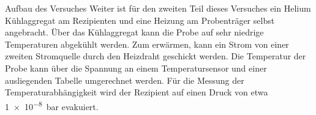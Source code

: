 \documentclass[pdftex, a4paper,11pt, twoside, ngerman]{report}
\begin{document}
\begin{chapter}{Aufbau des Versuches}
    Weiter ist für den zweiten Teil dieses Versuches ein Helium Kühlaggregat am
    Rezipienten und eine Heizung am Probenträger selbst angebracht.
    Über das Kühlaggregat kann die Probe auf sehr niedrige Temperaturen
    abgekühlt werden. Zum erwärmen, kann ein Strom von einer zweiten Stromquelle
    durch den Heizdraht geschickt werden. Die Temperatur der Probe kann über
    die Spannung an einem Temperatursensor und einer ausliegenden
    Tabelle umgerechnet werden.
    Für die Messung der Temperaturabhängigkeit wird der Rezipient auf einen
    Druck von etwa \SI{1e-8}{\bar} evakuiert.
    
    
  \end{chapter}
  
  
  
\end{document}
